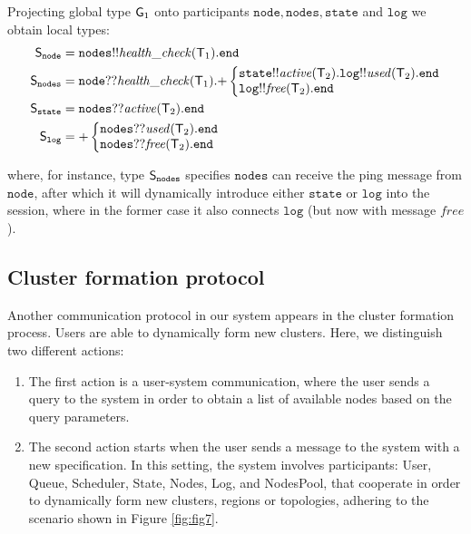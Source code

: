 Projecting global type ${\sf G}_1$ onto participants $\mathtt{node}, \mathtt{nodes}, \mathtt{state}$ and $\mathtt{log}$ we obtain local types:
\begin{align*}
\ST_\mathtt{node}  & = 
\mathtt{nodes}{!!}\mathit{health{\_}check}(\T_1).\tend \\
%
%
\ST_\mathtt{nodes} & = 
\mathtt{node}{??}\mathit{health{\_}check}(\T_1).
{+}
\left\{
\begin{array}{@{}l@{}}
\mathtt{state}{!!}\mathit{active}(\T_2).\mathtt{log}{!!}\mathit{used}(\T_2).\tend\\
\mathtt{log}{!!}\mathit{free}(\T_2).\tend
\end{array} \right.\\
%
%
\ST_\mathtt{state} &= 
\mathtt{nodes}{??}\mathit{active}(\T_2).\tend\\
%
%
\ST_\mathtt{log} &= 
{+}
\left\{
\begin{array}{@{}l@{}}
\mathtt{nodes}{??}\mathit{used}(\T_2).\tend\\
\mathtt{nodes}{??}\mathit{free}(\T_2).\tend
\end{array} \right.
\end{align*}

where, for instance, type ${\mathsf S}_\mathtt{nodes}$ specifies $\mathtt{nodes}$ can receive the ping message from $\mathtt{node}$, after which it will dynamically introduce either $\mathtt{state}$ or $\mathtt{log}$ into the session, where in the former case it also connects $\mathtt{log}$ (but now with message $\mathit{free}$). 
%
%
\subsection{Cluster formation protocol}\label{sec:cluster_formation_protocol}
%
Another communication protocol in our system appears in the cluster formation process. Users are able to dynamically form new clusters. Here, we distinguish two different actions:

\begin{enumerate}[start=1,label={(\bfseries \arabic*)}]
	\item The first action is a user-system communication, where the user sends a query to the system in order to obtain a list of available nodes based on the query parameters.
	\item The second action starts when the user sends a message to the system with a new specification. In this setting, the  system involves participants: User, Queue, Scheduler, State, Nodes, Log, and NodesPool, that cooperate in order to dynamically form new clusters, regions or topologies, adhering to the scenario shown in Figure \ref{fig:fig7}.
\end{enumerate} 

